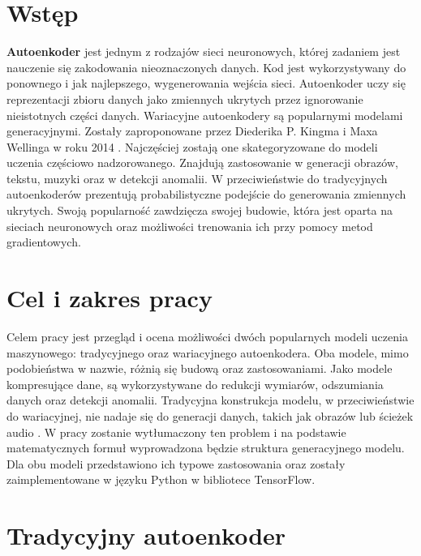 \documentclass[a4paper,12pt,oneside]{book} %
\begin{document}
\sloppy

\thispagestyle{empty}



\tableofcontents{}

\chapter*{Wstęp} %
\textbf{Autoenkoder} jest jednym z rodzajów sieci neuronowych, której zadaniem jest nauczenie się zakodowania nieoznaczonych danych. Kod jest wykorzystywany do ponownego i jak najlepszego, wygenerowania wejścia sieci. Autoenkoder uczy się reprezentacji zbioru danych jako zmiennych ukrytych przez ignorowanie nieistotnych części danych.
Wariacyjne autoenkodery są popularnymi modelami generacyjnymi. Zostały zaproponowane przez Diederika P. Kingma i Maxa Wellinga w roku 2014 \cite{kingma2014autoencoding}. Najczęściej zostają one skategoryzowane do modeli uczenia częściowo nadzorowanego. Znajdują zastosowanie w generacji obrazów, tekstu, muzyki oraz w detekcji anomalii. W przeciwieństwie do tradycyjnych autoenkoderów prezentują probabilistyczne podejście do generowania zmiennych ukrytych. Swoją popularność zawdzięcza swojej budowie, która jest oparta na sieciach neuronowych oraz możliwości trenowania ich przy pomocy metod gradientowych.
\chapter*{Cel i zakres pracy}
Celem pracy jest przegląd i ocena możliwości dwóch popularnych modeli uczenia maszynowego: tradycyjnego oraz wariacyjnego autoenkodera. Oba modele, mimo podobieństwa w nazwie, różnią się budową oraz zastosowaniami. Jako modele kompresujące dane, są wykorzystywane do redukcji wymiarów, odszumiania danych oraz detekcji anomalii. Tradycyjna konstrukcja modelu, w przeciwieństwie do wariacyjnej, nie nadaje się do generacji danych, takich jak obrazów lub ścieżek audio \cite{vaeaudio}. W pracy zostanie wytłumaczony ten problem i na podstawie matematycznych formuł wyprowadzona będzie struktura generacyjnego modelu. Dla obu modeli przedstawiono ich typowe zastosowania oraz zostały zaimplementowane w języku Python w bibliotece TensorFlow.
\chapter{Tradycyjny autoenkoder}
\end{document}
